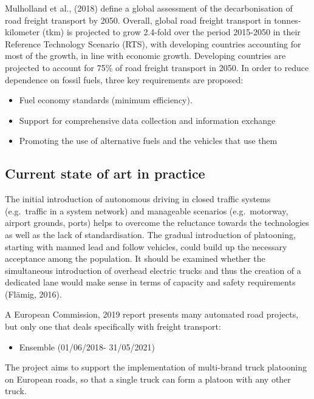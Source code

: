 \documentclass[
]{book}
\providecommand{\tightlist}{%
  \setlength{\itemsep}{0pt}\setlength{\parskip}{0pt}}
\begin{document}
Mulholland et al., (2018) define a global assessment of the decarbonisation of road freight transport by 2050. Overall, global road freight transport in tonnes-kilometer (tkm) is projected to grow 2.4-fold over the period 2015-2050 in their Reference Technology Scenario (RTS), with developing countries accounting for most of the growth, in line with economic growth. Developing countries are projected to account for 75\% of road freight transport in 2050. In order to reduce dependence on fossil fuels, three key requirements are proposed:

\begin{itemize}
\tightlist
\item
  Fuel economy standards (minimum efficiency).
\item
  Support for comprehensive data collection and information exchange
\item
  Promoting the use of alternative fuels and the vehicles that use them
\end{itemize}

\hypertarget{current-state-of-art-in-practice-22}{%
\subsection*{Current state of art in practice}\label{current-state-of-art-in-practice-22}}

The initial introduction of autonomous driving in closed traffic systems (e.g.~traffic in a system network) and manageable scenarios (e.g.~motorway, airport grounds, ports) helps to overcome the reluctance towards the technologies as well as the lack of standardisation. The gradual introduction of platooning, starting with manned lead and follow vehicles, could build up the necessary acceptance among the population. It should be examined whether the simultaneous introduction of overhead electric trucks and thus the creation of a dedicated lane would make sense in terms of capacity and safety requirements (Flämig, 2016).

A European Commission, 2019 report presents many automated road projects, but only one that deals specifically with freight transport:

\begin{itemize}
\tightlist
\item
  Ensemble (01/06/2018- 31/05/2021)
\end{itemize}

The project aims to support the implementation of multi-brand truck platooning on European roads, so that a single truck can form a platoon with any other truck.
\end{document}

